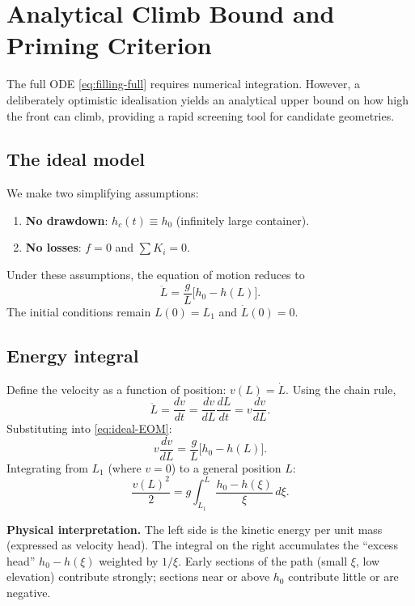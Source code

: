 \documentclass[11pt]{article}
\theoremstyle{definition}
\begin{document}
\section{Analytical Climb Bound and Priming Criterion}
\label{sec:bounds}

The full ODE \eqref{eq:filling-full} requires numerical integration. However, a deliberately 
optimistic idealisation yields an analytical upper bound on how high the front can climb, 
providing a rapid screening tool for candidate geometries.

\subsection{The ideal model}

We make two simplifying assumptions:
\begin{enumerate}[nosep]
  \item \textbf{No drawdown}: $h_c(t) \equiv h_0$ (infinitely large container).
  \item \textbf{No losses}: $f = 0$ and $\sum K_i = 0$.
\end{enumerate}
Under these assumptions, the equation of motion reduces to
\begin{equation}
  \ddot{L} = \frac{g}{L}\bigl[h_0 - h(L)\bigr].
  \label{eq:ideal-EOM}
\end{equation}
The initial conditions remain $L(0) = L_1$ and $\dot{L}(0) = 0$.

\subsection{Energy integral}

\label{sec:stall-derivation}

Define the velocity as a function of position: $v(L) = \dot{L}$. Using the chain rule,
\[
  \ddot{L} = \frac{dv}{dt} = \frac{dv}{dL} \frac{dL}{dt} = v \frac{dv}{dL}.
\]
Substituting into \eqref{eq:ideal-EOM}:
\[
  v \frac{dv}{dL} = \frac{g}{L}\bigl[h_0 - h(L)\bigr].
\]
Integrating from $L_1$ (where $v = 0$) to a general position $L$:
\begin{equation}
  \frac{v(L)^2}{2} = g \int_{L_1}^{L} \frac{h_0 - h(\xi)}{\xi}\,d\xi.
  \label{eq:energy-integral}
\end{equation}

\textbf{Physical interpretation.} The left side is the kinetic energy per unit mass 
(expressed as velocity head). The integral on the right accumulates the ``excess head'' 
$h_0 - h(\xi)$ weighted by $1/\xi$. Early sections of the path (small $\xi$, low elevation) 
contribute strongly; sections near or above $h_0$ contribute little or are negative.
\end{document}
